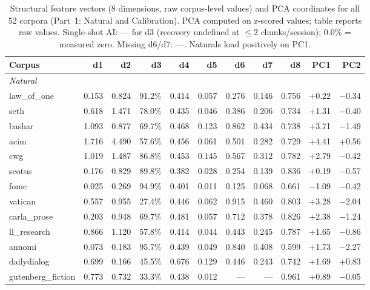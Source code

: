 \documentclass[final]{clv2025}
\begin{document}
\begin{landscape}
\begin{table}[p]
\centering
\caption{Structural feature vectors (8 dimensions, raw corpus-level values) and PCA coordinates for all 52 corpora (Part~1: Natural and Calibration). PCA computed on z-scored values; table reports raw values. Single-shot AI: --- for d3 (recovery undefined at $\leq$2 chunks/session); 0.0\% = measured zero. Missing d6/d7: ---. Naturals load positively on PC1.}
\label{tbl:compact-vector}
\footnotesize
\begin{tabular}{lrrrrrrrrrr}
\toprule
\textbf{Corpus} & \textbf{d1} & \textbf{d2} & \textbf{d3} & \textbf{d4} & \textbf{d5} & \textbf{d6} & \textbf{d7} & \textbf{d8} & \textbf{PC1} & \textbf{PC2} \\
\midrule
\multicolumn{11}{l}{\textit{Natural}} \\
law\_of\_one & 0.153 & 0.824 & 91.2\% & 0.414 & 0.057 & 0.276 & 0.146 & 0.756 & +0.22 & $-$0.34 \\
seth & 0.618 & 1.471 & 78.0\% & 0.435 & 0.046 & 0.386 & 0.206 & 0.734 & +1.31 & $-$0.40 \\
bashar & 1.093 & 0.877 & 69.7\% & 0.468 & 0.123 & 0.862 & 0.434 & 0.738 & +3.71 & $-$1.49 \\
acim & 1.716 & 4.490 & 57.6\% & 0.456 & 0.061 & 0.501 & 0.282 & 0.729 & +4.41 & +0.56 \\
cwg & 1.019 & 1.487 & 86.8\% & 0.453 & 0.145 & 0.567 & 0.312 & 0.782 & +2.79 & $-$0.42 \\
scotus & 0.176 & 0.829 & 89.8\% & 0.382 & 0.028 & 0.254 & 0.139 & 0.836 & +0.19 & $-$0.57 \\
fomc & 0.025 & 0.269 & 94.9\% & 0.401 & 0.011 & 0.125 & 0.068 & 0.661 & $-$1.09 & $-$0.42 \\
vatican & 0.557 & 0.955 & 27.4\% & 0.446 & 0.062 & 0.915 & 0.460 & 0.803 & +3.28 & $-$2.04 \\
carla\_prose & 0.203 & 0.948 & 69.7\% & 0.481 & 0.057 & 0.712 & 0.378 & 0.826 & +2.38 & $-$1.24 \\
ll\_research & 0.866 & 1.120 & 57.8\% & 0.414 & 0.044 & 0.443 & 0.245 & 0.787 & +1.65 & $-$0.86 \\
annomi & 0.073 & 0.183 & 95.7\% & 0.439 & 0.049 & 0.840 & 0.408 & 0.599 & +1.73 & $-$2.27 \\
dailydialog & 0.699 & 0.166 & 45.5\% & 0.676 & 0.129 & 0.446 & 0.243 & 0.742 & +1.69 & +0.83 \\
gutenberg\_fiction & 0.773 & 0.732 & 33.3\% & 0.438 & 0.012 & --- & --- & 0.961 & +0.89 & $-$0.05 \\

\end{tabular}
\end{table}
\end{landscape}
\end{document}
